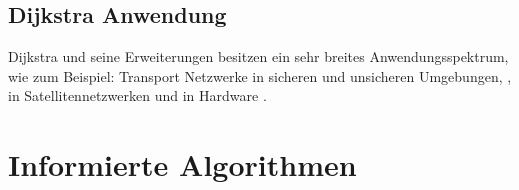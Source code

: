 \subsection{Dijkstra Anwendung}

Dijkstra und seine Erweiterungen besitzen ein sehr breites Anwendungsspektrum, wie zum Beispiel: Transport Netzwerke in sicheren und unsicheren Umgebungen, \cite{fuzzyDijk} \cite{publicTrans1} \cite{publicTrans2}, in Satellitennetzwerken \cite{satelite} und in Hardware \cite{hardware}. 

\section{Informierte Algorithmen}